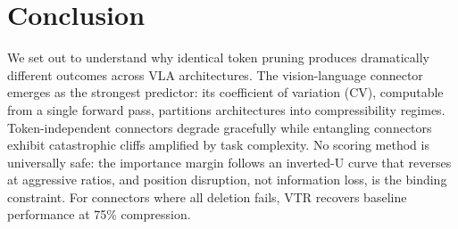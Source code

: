 \section{Conclusion}
\label{sec:conclusion}

We set out to understand why identical token pruning produces dramatically different outcomes across VLA architectures. The vision-language connector emerges as the strongest predictor: its coefficient of variation (CV), computable from a single forward pass, partitions architectures into compressibility regimes. Token-independent connectors degrade gracefully while entangling connectors exhibit catastrophic cliffs amplified by task complexity. No scoring method is universally safe: the importance margin follows an inverted-U curve that reverses at aggressive ratios, and position disruption, not information loss, is the binding constraint. For connectors where all deletion fails, VTR recovers baseline performance at 75\% compression.

